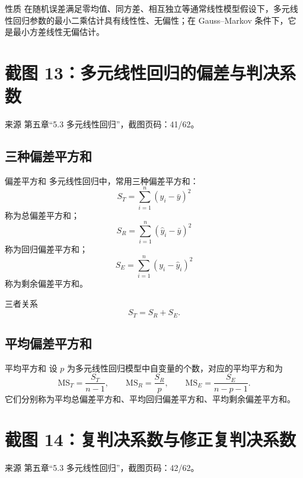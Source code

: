 \documentclass[UTF8,zihao=-4,fontset=fandol]{ctexart}
\begin{document}
\begin{methodbox}{性质}
在随机误差满足零均值、同方差、相互独立等通常线性模型假设下，多元线性回归参数的最小二乘估计具有线性性、无偏性；在 Gauss--Markov 条件下，它是最小方差线性无偏估计。
\end{methodbox}

\section{截图 13：多元线性回归的偏差与判决系数}

\begin{sourcebox}{来源}
第五章“5.3 多元线性回归”，截图页码：41/62。
\end{sourcebox}

\subsection{三种偏差平方和}

\begin{keybox}{偏差平方和}
多元线性回归中，常用三种偏差平方和：
\[
S_T=\sum_{i=1}^{n}(y_i-\bar{y})^2
\]
称为总偏差平方和；
\[
S_R=\sum_{i=1}^{n}(\hat{y}_i-\bar{y})^2
\]
称为回归偏差平方和；
\[
S_E=\sum_{i=1}^{n}(y_i-\hat{y}_i)^2
\]
称为剩余偏差平方和。
\end{keybox}

\begin{keybox}{三者关系}
\[
S_T=S_R+S_E.
\]
\end{keybox}

\subsection{平均偏差平方和}

\begin{keybox}{平均平方和}
设 $p$ 为多元线性回归模型中自变量的个数，对应的平均平方和为
\[
\mathrm{MS}_T=\frac{S_T}{n-1},
\qquad
\mathrm{MS}_R=\frac{S_R}{p},
\qquad
\mathrm{MS}_E=\frac{S_E}{n-p-1}.
\]
它们分别称为平均总偏差平方和、平均回归偏差平方和、平均剩余偏差平方和。
\end{keybox}

\section{截图 14：复判决系数与修正复判决系数}

\begin{sourcebox}{来源}
第五章“5.3 多元线性回归”，截图页码：42/62。
\end{sourcebox}
\end{document}
